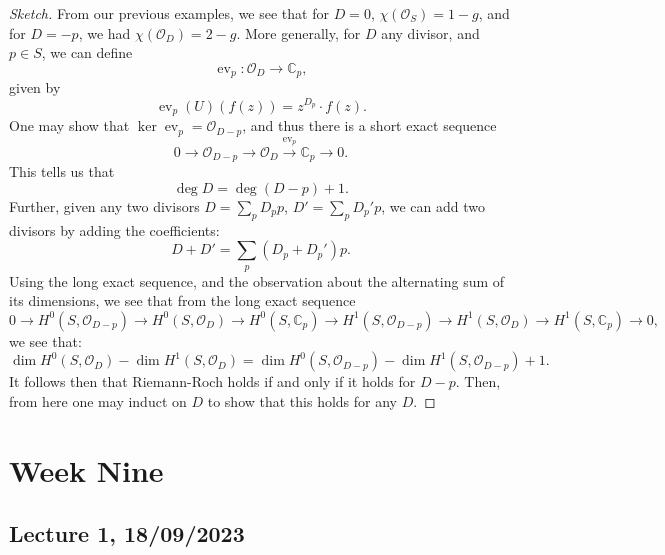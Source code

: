 \documentclass[a4paper]{report}
\theoremstyle{definition}
\theoremstyle{remark}
\theoremstyle{proposition}
\theoremstyle{conjecture}
\theoremstyle{lemma}
\theoremstyle{corollary}
\theoremstyle{exercise}
\theoremstyle{example}
\newcommand{\C}{\mathbb{C}}
\newcommand{\mcal}{\mathcal}
\newcommand{\on}{\operatorname}
\begin{document}
\begin{proof}[Sketch]
    From our previous examples, we see that for $D=0$, 
    $\chi(\mcal{O}_S) = 1-g$, and for $D=-p$, we had 
    $\chi(\mcal{O}_D) = 2-g$. More generally, for $D$ any divisor, and 
    $p\in S$, we can define 
    $$\on{ev}_p : \mcal{O}_D \longrightarrow \C_p,$$
    given by 
    $$\on{ev}_p(U) (f(z)) = z^{D_p}\cdot f(z).$$
    One may show that $\ker \on{ev}_p = \mcal{O}_{D-p}$,
    and thus there is a short exact sequence
    $$0\longrightarrow \mcal{O}_{D-p} \longrightarrow \mcal{O}_D \stackrel{\on{ev}_p}{\longrightarrow} \C_p\longrightarrow 0.$$
    This tells us that 
    $$\deg D = \deg (D-p) + 1.$$
    Further, given any two divisors $D = \sum_p D_pp$, $D' = \sum_pD_p'p$,
    we can add two divisors by adding the coefficients:
    $$D + D' = \sum_p(D_p + D_p')p.$$
    Using the long exact sequence, and the observation about the alternating sum
    of its dimensions, we see that from the long exact sequence
    $$0\longrightarrow H^0(S,\mcal{O}_{D-p})\longrightarrow H^0(S,\mcal{O}_D) \longrightarrow H^0(S,\C_p) \longrightarrow H^1(S,\mcal{O}_{D-p})\longrightarrow H^1(S,\mcal{O}_D) \longrightarrow H^1(S,\C_p) \longrightarrow 0,$$
    we see that:
    $$\dim H^0(S,\mcal{O}_D) - \dim H^1(S,\mcal{O}_D) = \dim H^0(S,\mcal{O}_{D-p}) -\dim H^1(S,\mcal{O}_{D-p}) + 1.$$
    It follows then that Riemann-Roch holds if and only if it holds for $D-p$.
    Then, from here one may induct on $D$ to show that this holds for 
    any $D$.
\end{proof}

\chapter{Week Nine}

\section{Lecture 1, 18/09/2023}
\end{document}
